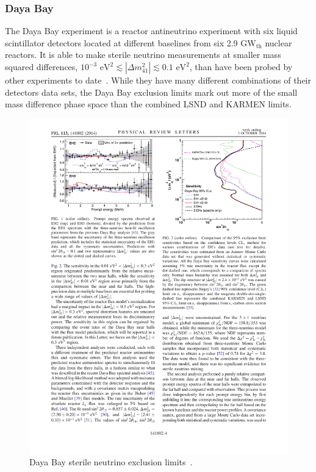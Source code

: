 \documentclass[aps,prd,twocolumn,nofootinbib]{revtex4-1}
\begin{document}
\subsubsection{Daya Bay}
The Daya Bay experiment is a reactor antineutrino experiment with six liquid scintillator detectors located at different baselines from six 2.9 GW$_\text{th}$ nuclear reactors. It is able to make sterile neutrino measurements at smaller mass squared differences, $10^{−3} \text{ eV}^2  \lesssim \left|\Delta m^{2}_{41}\right| \lesssim 0.1 \text{ eV}^2$, than have been probed by other experiments to date~\cite{DayaBay}. While they have many different combinations of their detectors data sets, the Daya Bay exclusion limits mark out more of the small mass difference phase space than the combined LSND and KARMEN limits.

\begin{figure}[H]
 \centering
 \includegraphics[width=1\columnwidth]{../figures/daya1.pdf}
 \caption{Daya Bay sterile neutrino exclusion limits~\cite{DayaBay}.}
 \label{fig:DayaBay}
\end{figure}
\end{document}
